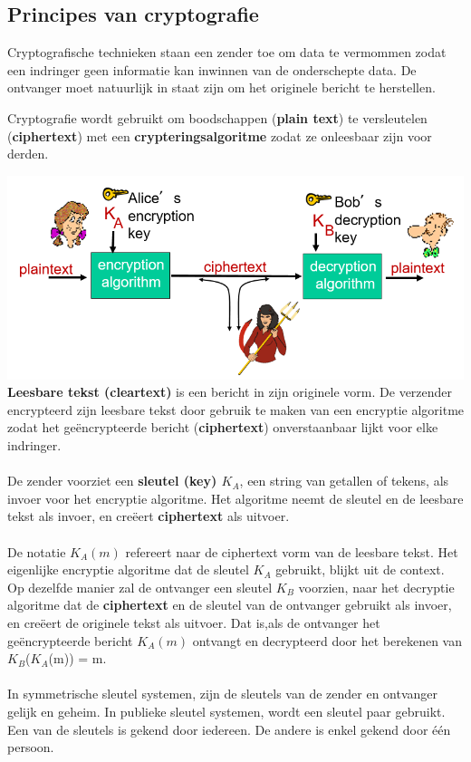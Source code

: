 \subsection{Principes van cryptografie}

Cryptografische technieken staan een zender toe om data te vermommen zodat een indringer geen informatie kan inwinnen van de onderschepte data. De ontvanger moet natuurlijk in staat zijn om het originele bericht te herstellen.

Cryptografie wordt gebruikt om boodschappen (\textbf{plain text}) te versleutelen (\textbf{ciphertext}) met een \textbf{crypteringsalgoritme} zodat ze onleesbaar zijn voor derden.

\includegraphics[width=7in]{./img/imghfdst8/hfdst8puntje2.png}\\[1cm]
\textbf{Leesbare tekst (cleartext)} is een bericht in zijn originele vorm. De verzender encrypteerd zijn leesbare tekst door gebruik te maken van een encryptie algoritme zodat het geëncrypteerde bericht (\textbf{ciphertext}) onverstaanbaar lijkt voor elke indringer. 
\\\\
De zender voorziet een \textbf{sleutel (key) $K_A$}, een string van getallen of tekens, als invoer voor het encryptie algoritme. Het algoritme neemt de sleutel en de leesbare tekst als invoer, en creëert \textbf{ciphertext} als uitvoer.
\\\\
De notatie $K_A (m)$ refereert naar de ciphertext vorm van de leesbare tekst. Het eigenlijke encryptie algoritme dat de sleutel $K_A $ gebruikt, blijkt uit de context.
Op dezelfde manier zal de ontvanger een sleutel $K_B$ voorzien, naar het decryptie algoritme dat de \textbf{ciphertext} en de sleutel van de ontvanger gebruikt als invoer, en creëert de originele tekst als uitvoer.
Dat is,als de ontvanger het geëncrypteerde bericht $K_A (m) $ ontvangt en decrypteerd door het berekenen van $K_B$($K_A$(m)) = m.
\\\\
In symmetrische sleutel systemen, zijn de sleutels van de zender en ontvanger gelijk en geheim.
In publieke sleutel systemen, wordt een sleutel paar gebruikt. Een van de sleutels is gekend door iedereen. De andere is enkel gekend door één persoon.


